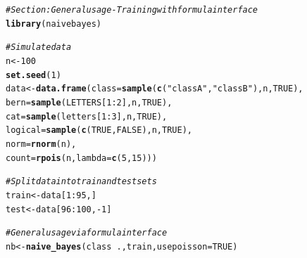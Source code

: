 \documentclass{article}\usepackage[]{graphicx}\usepackage[]{xcolor}
\makeatletter
\newcommand{\hlnum}[1]{\textcolor[rgb]{0.686,0.059,0.569}{#1}}%
\newcommand{\hlstr}[1]{\textcolor[rgb]{0.192,0.494,0.8}{#1}}%
\newcommand{\hlcom}[1]{\textcolor[rgb]{0.678,0.584,0.686}{\textit{#1}}}%
\newcommand{\hlopt}[1]{\textcolor[rgb]{0,0,0}{#1}}%
\newcommand{\hlstd}[1]{\textcolor[rgb]{0.345,0.345,0.345}{#1}}%
\newcommand{\hlkwb}[1]{\textcolor[rgb]{0.69,0.353,0.396}{#1}}%
\newcommand{\hlkwc}[1]{\textcolor[rgb]{0.333,0.667,0.333}{#1}}%
\newcommand{\hlkwd}[1]{\textcolor[rgb]{0.737,0.353,0.396}{\textbf{#1}}}%
\newenvironment{kframe}{%
 \def\at@end@of@kframe{}%
 \ifinner\ifhmode%
  \def\at@end@of@kframe{\end{minipage}}%
  \begin{minipage}{\columnwidth}%
 \fi\fi%
 \def\FrameCommand##1{\hskip\@totalleftmargin \hskip-\fboxsep
 \colorbox{shadecolor}{##1}\hskip-\fboxsep
     \hskip-\linewidth \hskip-\@totalleftmargin \hskip\columnwidth}%
 \MakeFramed {\advance\hsize-\width
   \@totalleftmargin\z@ \linewidth\hsize
   \@setminipage}}%
 {\par\unskip\endMakeFramed%
 \at@end@of@kframe}
\newenvironment{knitrout}{}{} %
\makeatother
\begin{document}
\begin{knitrout}
\color{fgcolor}\begin{kframe}
\begin{alltt}
\hlcom{# Section: General usage - Training with formula interface}
\hlkwd{library}\hlstd{(naivebayes)}
\end{alltt}


{\ttfamily\noindent\itshape\color{messagecolor}{\#\# naivebayes 1.0.0 loaded}}

{\ttfamily\noindent\itshape\color{messagecolor}{\#\# For more information please visit:}}

{\ttfamily\noindent\itshape\color{messagecolor}{\#\# https://majkamichal.github.io/naivebayes/}}\begin{alltt}
\hlcom{# Simulate data}
\hlstd{n} \hlkwb{<-} \hlnum{100}
\hlkwd{set.seed}\hlstd{(}\hlnum{1}\hlstd{)}
\hlstd{data} \hlkwb{<-} \hlkwd{data.frame}\hlstd{(}\hlkwc{class} \hlstd{=} \hlkwd{sample}\hlstd{(}\hlkwd{c}\hlstd{(}\hlstr{"classA"}\hlstd{,} \hlstr{"classB"}\hlstd{), n,} \hlnum{TRUE}\hlstd{),}
                   \hlkwc{bern} \hlstd{=} \hlkwd{sample}\hlstd{(LETTERS[}\hlnum{1}\hlopt{:}\hlnum{2}\hlstd{], n,} \hlnum{TRUE}\hlstd{),}
                   \hlkwc{cat}  \hlstd{=} \hlkwd{sample}\hlstd{(letters[}\hlnum{1}\hlopt{:}\hlnum{3}\hlstd{], n,} \hlnum{TRUE}\hlstd{),}
                   \hlkwc{logical} \hlstd{=} \hlkwd{sample}\hlstd{(}\hlkwd{c}\hlstd{(}\hlnum{TRUE}\hlstd{,}\hlnum{FALSE}\hlstd{), n,} \hlnum{TRUE}\hlstd{),}
                   \hlkwc{norm} \hlstd{=} \hlkwd{rnorm}\hlstd{(n),}
                   \hlkwc{count} \hlstd{=} \hlkwd{rpois}\hlstd{(n,} \hlkwc{lambda} \hlstd{=} \hlkwd{c}\hlstd{(}\hlnum{5}\hlstd{,}\hlnum{15}\hlstd{)))}

\hlcom{# Split data into train and test sets}
\hlstd{train} \hlkwb{<-} \hlstd{data[}\hlnum{1}\hlopt{:}\hlnum{95}\hlstd{, ]}
\hlstd{test} \hlkwb{<-} \hlstd{data[}\hlnum{96}\hlopt{:}\hlnum{100}\hlstd{,} \hlopt{-}\hlnum{1}\hlstd{]}

\hlcom{# General usage via formula interface}
\hlstd{nb} \hlkwb{<-} \hlkwd{naive_bayes}\hlstd{(class} \hlopt{~} \hlstd{., train,} \hlkwc{usepoisson} \hlstd{=} \hlnum{TRUE}\hlstd{)}


\end{alltt}
\end{kframe}
\end{knitrout}
\end{document}
